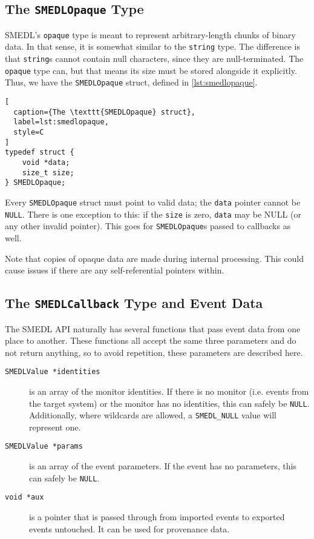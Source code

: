 \documentclass[paper=letter,titlepage,captions=tableheading]{scrartcl}
\begin{document}
\subsection{The \texttt{SMEDLOpaque} Type}
\label{subsec:smedlopaque}

SMEDL's \texttt{opaque} type is meant to represent arbitrary-length chunks of
binary data. In that sense, it is somewhat similar to the \texttt{string} type.
The difference is that \texttt{string}s cannot contain null characters, since
they are null-terminated. The \texttt{opaque} type can, but that means its
size must be stored alongside it explicitly. Thus, we have the
\texttt{SMEDLOpaque} struct, defined in \autoref{lst:smedlopaque}.

\begin{lstlisting}[
  caption={The \texttt{SMEDLOpaque} struct},
  label=lst:smedlopaque,
  style=C
]
typedef struct {
    void *data;
    size_t size;
} SMEDLOpaque;
\end{lstlisting}

Every \texttt{SMEDLOpaque} struct must point to valid data; the \texttt{data}
pointer cannot be \texttt{NULL}\@. There is one exception to this: if the
\texttt{size} is zero, \texttt{data} may be NULL (or any other invalid
pointer). This goes for \texttt{SMEDLOpaque}s passed to callbacks as well.

Note that copies of opaque data are made during internal processing. This could
cause issues if there are any self-referential pointers within.


\subsection{The \texttt{SMEDLCallback} Type and Event Data}
\label{subsec:smedlcallback}

The SMEDL API naturally has several functions that pass event data from one
place to another. These functions all accept the same three parameters and do
not return anything, so to avoid repetition, these parameters are described
here.

\begin{description}
  \item[\texttt{SMEDLValue *identities}] is an array of the monitor identities.
    If there is no monitor (i.e. events from the target system) or the monitor
    has no identities, this can safely be \texttt{NULL}\@. Additionally, where
    wildcards are allowed, a \texttt{SMEDL\_NULL} value will represent one.
  \item[\texttt{SMEDLValue *params}] is an array of the event parameters. If
    the event has no parameters, this can safely be \texttt{NULL}\@.
  \item[\texttt{void *aux}] is a pointer that is passed through from imported
    events to exported events untouched. It can be used for provenance data.
\end{description}
\end{document}
